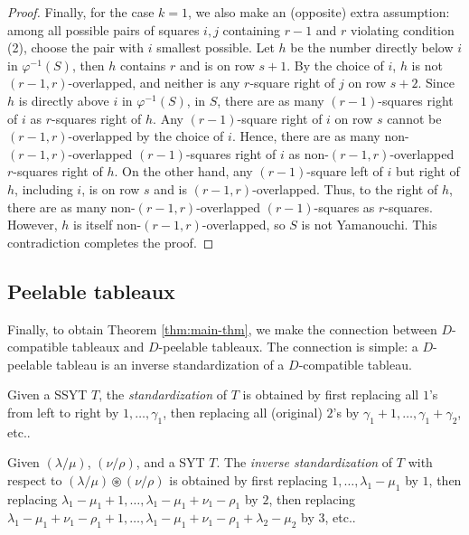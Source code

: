 \documentclass[ALCO,Unicode]{cedram}
\begin{document}
\begin{proof}
        Finally, for the case $k = 1$, we also make an (opposite) extra assumption: among all possible pairs of squares $i,j$ containing $r-1$ and $r$ violating condition (2), choose the pair with $i$ smallest possible. Let $h$ be the number directly below $i$ in $\varphi^{-1}(S)$, then $h$ contains $r$ and is on row $s+1$. By the choice of $i$, $h$ is not $(r-1,r)$-overlapped, and neither is any $r$-square right of $j$ on row $s+2$. Since $h$ is directly above $i$ in $\varphi^{-1}(S)$, in $S$, there are as many $(r-1)$-squares right of $i$ as $r$-squares right of $h$. Any $(r-1)$-square right of $i$ on row $s$ cannot be $(r-1,r)$-overlapped by the choice of $i$. Hence, there are as many non-$(r-1,r)$-overlapped $(r-1)$-squares right of $i$ as non-$(r-1,r)$-overlapped $r$-squares right of $h$. On the other hand, any $(r-1)$-square left of $i$ but right of $h$, including $i$, is on row $s$ and is $(r-1,r)$-overlapped. Thus, to the right of $h$, there are as many non-$(r-1,r)$-overlapped $(r-1)$-squares as $r$-squares. However, $h$ is itself non-$(r-1,r)$-overlapped, so $S$ is not Yamanouchi. This contradiction completes the proof.
    \end{proof}

\subsection{Peelable tableaux}

    Finally, to obtain Theorem \ref{thm:main-thm}, we make the connection between $D$-compatible tableaux and $D$-peelable tableaux. The connection is simple: a $D$-peelable tableau is an inverse standardization of a $D$-compatible tableau.

    \begin{defi}\label{def:standard}
        Given a SSYT $T$, the \textit{standardization} of $T$ is obtained by first replacing all $1$'s from left to right by $1,\ldots,\gamma_1$, then replacing all (original) $2$'s by $\gamma_1+1,\ldots,\gamma_1 + \gamma_2$, etc..
    
        Given $(\lambda/\mu)$, $(\nu/\rho)$, and a SYT $T$. The \textit{inverse standardization} of $T$ with respect to $(\lambda/\mu)\circledast(\nu/\rho)$ is obtained by first replacing $1,\ldots,\lambda_1 - \mu_1$ by $1$, then replacing $\lambda_1-\mu_1 + 1,\ldots,\lambda_1-\mu_1 + \nu_1-\rho_1$ by $2$, then replacing $\lambda_1-\mu_1 + \nu_1-\rho_1+1,\ldots,\lambda_1-\mu_1 + \nu_1-\rho_1+\lambda_2 - \mu_2$ by 3, etc..
    \end{defi}
\end{document}
